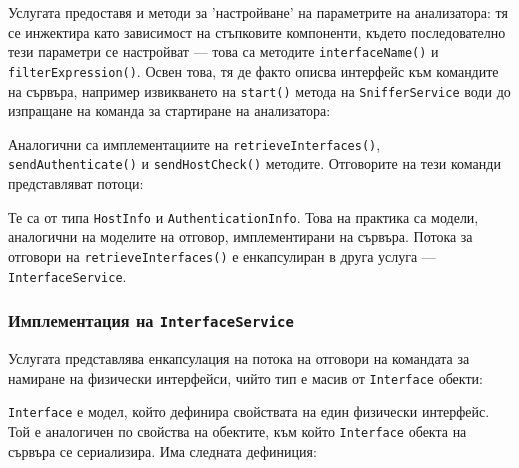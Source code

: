 \documentclass[12pt,a4paper,oneside]{book}
\begin{document}


Услугата предоставя и методи за 'настройване' на
параметрите на анализатора: тя се инжектира като зависимост на
стъпковите компоненти, където последователно тези параметри се настройват --- това
са методите \texttt{interfaceName()} и \texttt{filterExpression()}.
Освен това, тя де факто описва интерфейс към
командите на сървъра, например извикването на \texttt{start()} метода на
\texttt{SnifferService} води до изпращане на команда за стартиране на
анализатора:



Аналогични са имплементациите на \texttt{retrieveInterfaces()}, \texttt{sendAuthenticate()} и
\texttt{sendHostCheck()} методите. Отговорите на тези команди представляват
потоци:



Те са от типа \texttt{HostInfo} и \texttt{AuthenticationInfo}. Това
на практика са модели, аналогични на моделите на отговор, имплементирани на
сървъра. Потока за отговори на \texttt{retrieveInterfaces()} е енкапсулиран в
друга услуга --- \texttt{InterfaceService}.

\subsubsection{Имплементация на \texttt{InterfaceService}}

Услугата представлява енкапсулация на потока на отговори на командата за
намиране на физически интерфейси, чийто тип е масив от \texttt{Interface}
обекти:



\texttt{Interface} е модел, който дефинира свойствата на един физически
интерфейс. Той е аналогичен по свойства на обектите, към който
\texttt{Interface} обекта на сървъра се сериализира. Има следната дефиниция:
\end{document}
